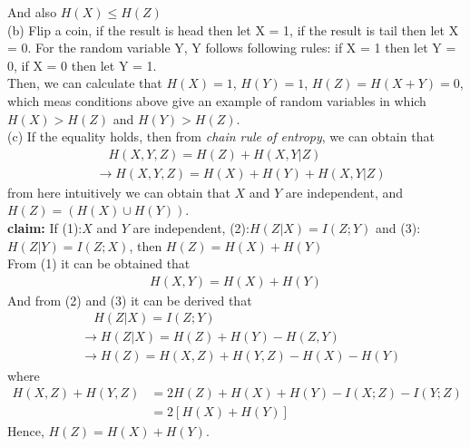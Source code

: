 \documentclass[12pt]{article}
\begin{document}
	And also $H(X) \leq H(Z)$ \\
	(b) Flip a coin, if the result is head then let X = 1, if the result is tail then let X = 0. For the random variable Y, Y follows following rules: if X = 1 then let Y = 0, if X = 0 then let Y = 1. \\
	Then, we can calculate that $H(X) = 1$, $H(Y) = 1$, $H(Z) = H(X+Y) = 0$, which meas conditions above give an example of random variables in which $H(X) > H(Z)$ and $H(Y) > H(Z)$. \\
	(c) If the equality holds, then from \textit{chain rule of entropy}, we can obtain that 
	\begin{align*}
		&\quad H(X,Y,Z) = H(Z) + H(X,Y|Z) \\
		&\rightarrow H(X,Y,Z) = H(X) + H(Y) + H(X,Y|Z) 
	\end{align*}
	from here intuitively we can obtain that $X$ and $Y$ are independent, and $H(Z) = (H(X)\cup H(Y))$.\\
	\textbf{claim:} If (1):$X$ and $Y$ are independent, (2):$H(Z|X) = I(Z;Y)$ and (3):$H(Z|Y) = I(Z;X)$, then $H(Z) = H(X) + H(Y)$ \\
	From (1) it can be obtained that 
	\begin{align*}
		H(X,Y) = H(X) + H(Y)
	\end{align*}
	And from (2) and (3) it can be derived that 
	\begin{align*}
		&\quad H(Z|X) = I(Z;Y) \\
		&\rightarrow H(Z|X) = H(Z)+H(Y)-H(Z,Y)  \\
		&\rightarrow H(Z) = H(X,Z)+H(Y,Z)-H(X)-H(Y) 
	\end{align*}
	where
	\begin{align*}
		H(X,Z)+H(Y,Z) &= 2H(Z)+H(X)+H(Y)-I(X;Z)-I(Y;Z)\\
		              &= 2[H(X)+H(Y)]
	\end{align*} 
	Hence, $H(Z) = H(X) + H(Y)$. 
\end{document}
